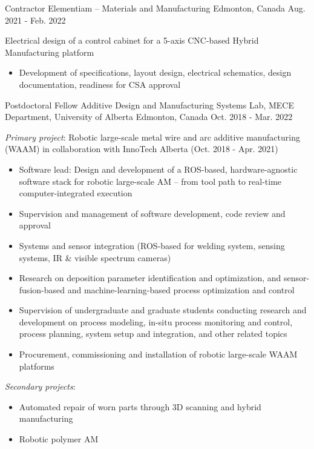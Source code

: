 \begin{cventries}
  \cventry
    {Contractor} %
    {Elementiam -- Materials and Manufacturing} %
    {Edmonton, Canada} %
    {Aug. 2021 - Feb. 2022} %
    {
      \begin{cvitems}
        \item Electrical design of a control cabinet for a 5-axis CNC-based Hybrid Manufacturing platform
        \begin{itemize}
          \item Development of specifications, layout design, electrical schematics, design documentation, readiness for CSA approval
        \end{itemize}
      \end{cvitems}
    }

  \cventry
    {Postdoctoral Fellow} %
    {Additive Design and Manufacturing Systems Lab, MECE Department, University of Alberta} %
    {Edmonton, Canada} %
    {Oct. 2018 - Mar. 2022} %
    {
      \begin{cvitems}
        \item \emph{Primary project}: Robotic large-scale metal wire and arc additive manufacturing (WAAM) \newline
        in collaboration with InnoTech Alberta (Oct. 2018 - Apr. 2021)
        \begin{itemize}
          \item Software lead: Design and development of a ROS-based, hardware-agnostic software stack for robotic large-scale AM -- from tool path to real-time computer-integrated execution
          \item Supervision and management of software development, code review and approval
          \item Systems and sensor integration (ROS-based for welding system, sensing systems, IR \& visible spectrum cameras)
          \item Research on deposition parameter identification and optimization, and sensor-fusion-based and machine-learning-based process optimization and control
          \item Supervision of undergraduate and graduate students conducting research and development on process modeling, 
                in-situ process monitoring and control, process planning, system setup and integration, and other related topics
          \item Procurement, commissioning and installation of robotic large-scale WAAM platforms
        \end{itemize}
        \item \emph{Secondary projects}:
        \begin{itemize}
          \item Automated repair of worn parts through 3D scanning and hybrid manufacturing
          \item Robotic polymer AM
        \end{itemize}
      \end{cvitems}
    }


\end{cventries}
